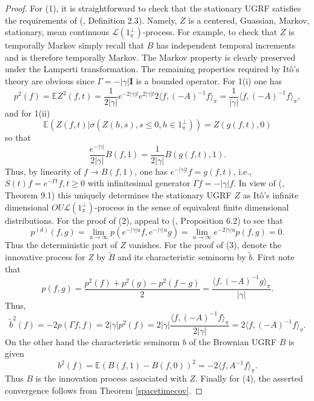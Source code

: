 \documentclass[11pt]{article}
\numberwithin{equation}{section}
\theoremstyle{definition}
\theoremstyle{remark}
\theoremstyle{definition}
\begin{document}
\begin{proof}
For (1), it is straightforward to check that the stationary
UGRF satisfies the requirements of 
(\cite{ito}, Definition 2.3). Namely, $Z$ is a centered,
Guassian, Markov, stationary, mean continuous 
$\mathcal{L}(1_\pi^\perp)$-process. 
For example, to check that $Z$ is temporally Markov simply
recall that $B$ has independent temporal increments
and is therefore temporally Markov. The Markov property
is clearly preserved under the Lamperti transformation.
The remaining properties required by It\^o's 
theory are
obvious since $\Gamma =-|\gamma|{\mathbf I}$ is a bounded operator.
For 1(i) one has 
\begin{equation}
p^2(f) = \mathbb{E}Z^2(f,t) = \frac{1}{2|\gamma|}
e^{-2|\gamma|t}e^{2|\gamma|t}2\langle f,(-A)^{-1}f\rangle_\pi
=  \frac{1}{|\gamma|}
\langle f,(-A)^{-1}f\rangle_\pi,
\end{equation}
and for 1(ii)
\begin{equation}
\mathbb{E}(Z(f,t)\vert\sigma(Z(h,s), s\le 0,h\in1_\pi^\perp))
= Z(g(f,t),0)
\end{equation}
so that 
\begin{equation}
\frac{e^{-|\gamma|}}{2|\gamma|}B(f,1)
=\frac{1}{2|\gamma|}B(g(f,t),1).
\end{equation}
Thus, by linearity of $f\to B(f,1)$, one has
$e^{-|\gamma|t}f=g(f,t)$, i.e., 
$S(t)f = e^{-\Gamma t}f, t\ge 0$ with infinitesimal
generator $\Gamma f= -|\gamma|f$.
In view of (\cite{ito}, Theorem 9.1) this
uniquely determines the stationary UGRF
$Z$ as It\^o's  infinite dimensional $OU\mathcal{L}(1_\pi^\perp)$-process in the sense
of equivalent finite dimensional distributions.
For the proof of (2), appeal to 
(\cite{ito}, Proposition 6.2) to see that
\begin{equation}
p^{(d)}(f,g)=\lim_{u\to\infty}p(e^{-|\gamma|u}f,e^{-|\gamma|u}g) =\lim_{u\to\infty}e^{-2|\gamma|u}p(f,g)=0.
\end{equation}
Thus the deterministic part of $Z$ vanishes. For the proof
of (3), denote the innovative process for $Z$ by
$\tilde{B}$ and its characteristic seminorm 
by $\tilde{b}$.  First note that
\begin{equation}
p(f,g)=\frac{p^2(f)+p^2(g)-p^2(f-g)}{2}
= \frac{\langle f,(-A)^{-1}g\rangle_\pi}{|\gamma|}.
\end{equation}
Thus,
\begin{equation}
\tilde{b}^2(f) = -2p(\Gamma f,f) = 2|\gamma|p^2(f)
= 2|\gamma|\frac{\langle f,(-A)^{-1}f\rangle_\pi}{2|\gamma|}
= 2\langle f,(-A)^{-1}f\rangle_\pi.
\end{equation}
On the other hand the characteristic seminorm $b$ of 
the Brownian UGRF $B$ is given
\begin{equation}
b^2(f) = \mathbb{E}(B(f,1)-B(f,0))^2 = 
-2\langle f,A^{-1}f\rangle_\pi.
\end{equation}
Thus $B$ is the innovation process associated with
$Z$.  
Finally for (4), the asserted convergence follows from Theorem \ref{spacetimecov}.
\end{proof}
\end{document}
